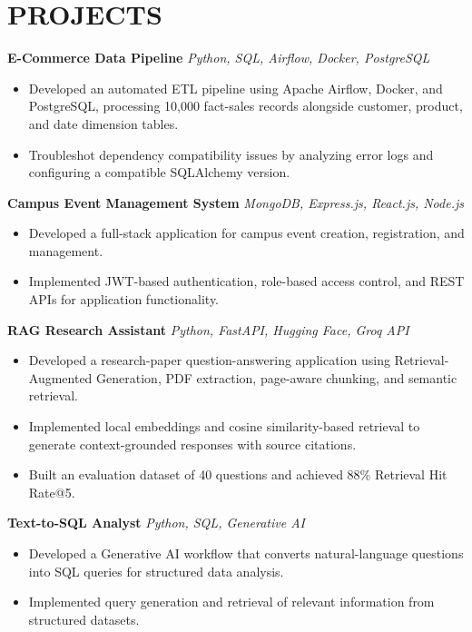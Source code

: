 \documentclass[a4paper,10pt]{article}
\begin{document}
\section*{PROJECTS}

\textbf{E-Commerce Data Pipeline}
\hfill
\textit{Python, SQL, Airflow, Docker, PostgreSQL}

\begin{itemize}
    \item Developed an automated ETL pipeline using
    Apache Airflow, Docker, and PostgreSQL, processing
    10,000 fact-sales records alongside customer,
    product, and date dimension tables.
    \item Troubleshot dependency compatibility issues
    by analyzing error logs and configuring a compatible
    SQLAlchemy version.
\end{itemize}

\textbf{Campus Event Management System}
\hfill
\textit{MongoDB, Express.js, React.js, Node.js}

\begin{itemize}
    \item Developed a full-stack application for campus
    event creation, registration, and management.
    \item Implemented JWT-based authentication,
    role-based access control, and REST APIs for
    application functionality.
\end{itemize}

\textbf{RAG Research Assistant}
\hfill
\textit{Python, FastAPI, Hugging Face, Groq API}

\begin{itemize}
    \item Developed a research-paper question-answering
    application using Retrieval-Augmented Generation,
    PDF extraction, page-aware chunking, and semantic retrieval.
    \item Implemented local embeddings and cosine similarity-based
    retrieval to generate context-grounded responses with
    source citations.
    \item Built an evaluation dataset of 40 questions and
    achieved 88\% Retrieval Hit Rate@5.
\end{itemize}

\textbf{Text-to-SQL Analyst}
\hfill
\textit{Python, SQL, Generative AI}

\begin{itemize}
    \item Developed a Generative AI workflow that converts
    natural-language questions into SQL queries for
    structured data analysis.
    \item Implemented query generation and retrieval of
    relevant information from structured datasets.
\end{itemize}
\end{document}
